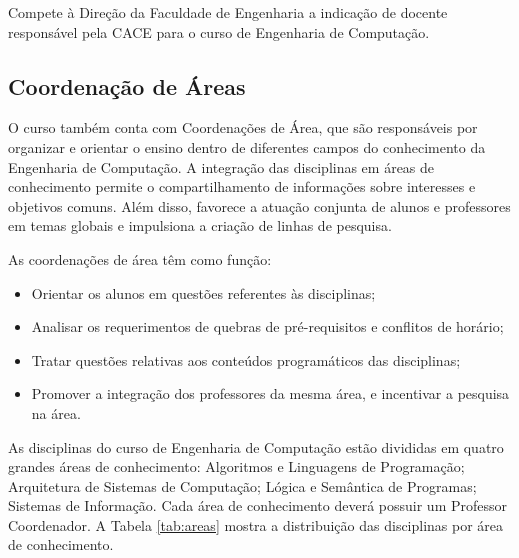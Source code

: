 Compete à Direção da Faculdade de Engenharia a indicação de docente responsável pela CACE para o curso de Engenharia de Computação.

\subsection{Coordenação de Áreas}

O curso também conta com Coordenações de Área, que são responsáveis por organizar e orientar o ensino dentro de diferentes campos do conhecimento da Engenharia de Computação.
A integração das disciplinas em áreas de conhecimento permite o compartilhamento de informações sobre interesses e objetivos comuns. Além disso, favorece a atuação conjunta de alunos e professores em temas globais e impulsiona a criação de linhas de pesquisa.


As coordenações de área têm como função:

\begin{itemize}
    \item Orientar os alunos em questões referentes às disciplinas;
    \item Analisar os requerimentos de quebras de pré-requisitos e conflitos de horário;
    \item Tratar questões relativas aos conteúdos programáticos das disciplinas;
    \item Promover a integração dos professores da mesma área, e incentivar a pesquisa na área.
\end{itemize}

As disciplinas do curso de Engenharia de Computação estão divididas em quatro grandes áreas de conhecimento: Algoritmos e Linguagens de Programação; Arquitetura de Sistemas de Computação; Lógica e Semântica de Programas; Sistemas de Informação. Cada área de conhecimento deverá possuir um Professor Coordenador. A Tabela \ref{tab:areas} mostra a distribuição das disciplinas por área de conhecimento.

